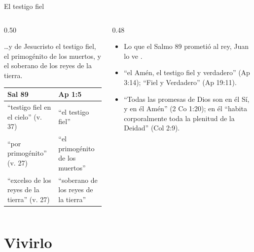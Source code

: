 \begin{frame}{El testigo fiel}
\begin{columns}[t,onlytextwidth]
\begin{column}{0.50\textwidth}
\begin{cita}\ldots{}y de Jesucristo el testigo fiel, el primogénito de los muertos, y el soberano de los reyes de la tierra.\end{cita}
\scriptsize\renewcommand{\arraystretch}{1.1}
\begin{tabular}{@{}>{\RaggedRight\arraybackslash}p{2.4cm}>{\RaggedRight\arraybackslash}p{3.3cm}@{}}
\toprule
\textbf{Sal 89} & \textbf{Ap 1:5} \\ \midrule
``testigo fiel en el cielo'' (v. 37) & ``el testigo fiel'' \\
``por primogénito'' (v. 27) & ``el primogénito de los muertos'' \\
``excelso de los reyes de la tierra'' (v. 27) & ``soberano de los reyes de la tierra'' \\
\bottomrule
\end{tabular}
\end{column}
\begin{column}{0.48\textwidth}\small
\begin{itemize}
\item Lo que el Salmo 89 prometió al rey, Juan lo ve .
\item ``el Amén, el testigo fiel y verdadero'' (Ap 3:14); ``Fiel y Verdadero'' (Ap 19:11).
\item ``Todas las promesas de Dios son en él Sí, y en él Amén'' (2 Co 1:20); en él ``habita corporalmente toda la plenitud de la Deidad'' (Col 2:9).
\end{itemize}
\end{column}
\end{columns}
\end{frame}

\section{Vivirlo}

